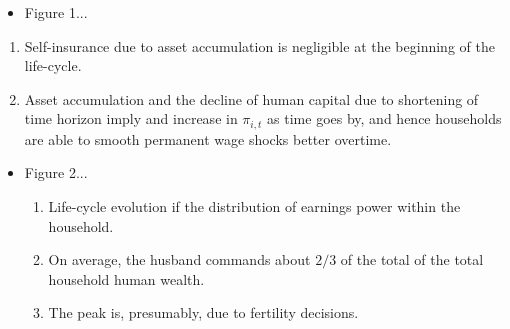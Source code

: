 \documentclass[notes=show]{beamer}
\begin{document}
\begin{frame}%



\begin{itemize}
\item Figure 1...
\end{itemize}

\begin{enumerate}
\item Self-insurance due to asset accumulation is negligible at the
beginning of the life-cycle.

\item Asset accumulation and the decline of human capital due to shortening
of time horizon imply and increase in $\pi _{i,t}$ as time goes by, and
hence households are able to smooth permanent wage shocks better overtime.
\end{enumerate}

\begin{itemize}
\item Figure 2...

\begin{enumerate}
\item Life-cycle evolution if the distribution of earnings power within the
household.

\item On average, the husband commands about $2/3$ of the total of the total
household human wealth.

\item The peak is, presumably, due to fertility decisions.
\end{enumerate}
\end{itemize}

\transboxout%
\end{frame}%

\bigskip
\end{document}
